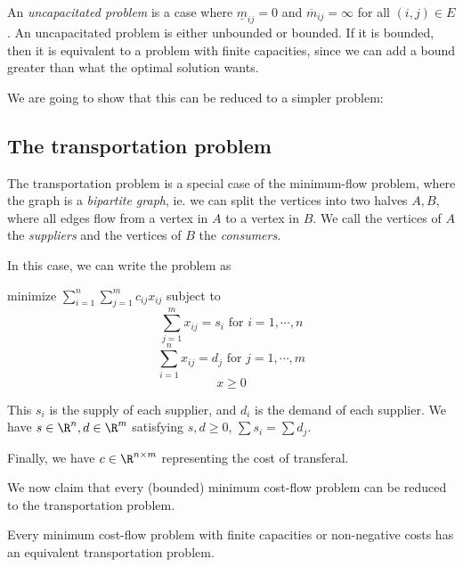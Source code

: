\documentclass[a4paper]{article}
\begin{document}
An \emph{uncapacitated problem} is a case where $\underline{m}_{ij} = 0$ and $\overline{m}_{ij} = \infty$ for all $(i, j) \in E$. An uncapacitated problem is either unbounded or bounded. If it is bounded, then it is equivalent to a problem with finite capacities, since we can add a bound greater than what the optimal solution wants.

We are going to show that this can be reduced to a simpler problem:

\subsection{The transportation problem}
The transportation problem is a special case of the minimum-flow problem, where the graph is a \emph{bipartite graph}, ie. we can split the vertices into two halves $A, B$, where all edges flow from a vertex in $A$ to a vertex in $B$. We call the vertices of $A$ the \emph{suppliers} and the vertices of $B$ the \emph{consumers}.

In this case, we can write the problem as
\begin{center}
  minimize $\displaystyle\sum_{i = 1}^n\sum_{j = 1}^m c_{ij}x_{ij}$ subject to
  \[
    \sum_{j = 1}^m x_{ij} = s_i\text{ for }i = 1, \cdots, n
  \]
  \[
    \sum_{i = 1}^n x_{ij} = d_j\text{ for }j = 1, \cdots, m
  \]
  \[
    x\geq 0
  \]
\end{center}
This $s_i$ is the supply of each supplier, and $d_i$ is the demand of each supplier. We have $s\in \R^n, d\in \R^m$ satisfying $s, d\geq 0$, $\sum s_i = \sum d_j$.

Finally, we have $c\in \R^{n\times m}$ representing the cost of transferal.

We now claim that every (bounded) minimum cost-flow problem can be reduced to the transportation problem.

\begin{thm}[]
  Every minimum cost-flow problem with finite capacities or non-negative costs has an equivalent transportation problem.
\end{thm}
\end{document}
